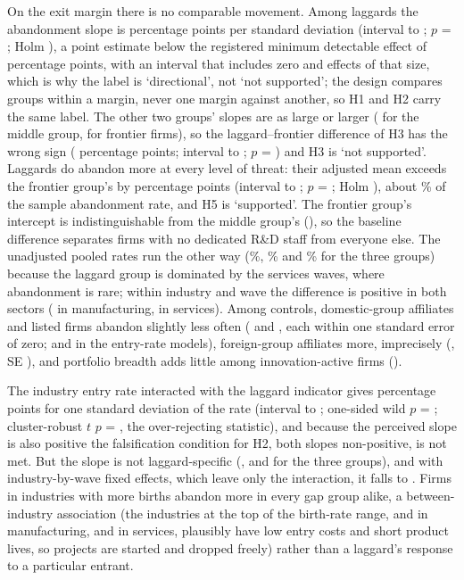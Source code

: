 \documentclass[preprint,12pt,authoryear]{elsarticle}
\begin{document}
On the exit margin there is no comparable movement. Among laggards the abandonment slope is \KISHTwoPp{} percentage points per standard deviation (interval \KISHTwoLoPp{} to \KISHTwoHiPp; $p$ = \KISHTwoPOne; Holm \KISHTwoHolm), a point estimate below the registered minimum detectable effect of \MDEQuitPp{} percentage points, with an interval that includes zero and effects of that size, which is why the label is `directional', not `not supported'; the design compares groups within a margin, never one margin against another, so H1 and H2 carry the same label. The other two groups' slopes are as large or larger (\CoefQuitXGOne{} for the middle group, \CoefQuitXGTwo{} for frontier firms), so the laggard--frontier difference of H3 has the wrong sign (\KISHThreePp{} percentage points; interval \KISHThreeLoPp{} to \KISHThreeHiPp; $p$ = \KISHThreePOne) and H3 is `not supported'. Laggards do abandon more at every level of threat: their adjusted mean exceeds the frontier group's by \KISHFivePp{} percentage points (interval \KISHFiveLoPp{} to \KISHFiveHiPp; $p$ = \KISHFivePOne; Holm \KISHFiveHolm), about \KISHFiveRelMeanPct\% of the sample abandonment rate, and H5 is `supported'. The frontier group's intercept is indistinguishable from the middle group's (\CoefQuitGTwo), so the baseline difference separates firms with no dedicated R\&D staff from everyone else. The unadjusted pooled rates run the other way (\RawQuitGZeroPct\%, \RawQuitGOnePct\% and \RawQuitGTwoPct\% for the three groups) because the laggard group is dominated by the services waves, where abandonment is rare; within industry and wave the difference is positive in both sectors (\RobManuHFiveEst{} in manufacturing, \RobServHFiveEst{} in services). Among controls, domestic-group affiliates and listed firms abandon slightly less often (\CoefQuitGroupDom{} and \CoefQuitListed, each within one standard error of zero; \CoefQuitObjGroupDom{} and \CoefQuitObjListed{} in the entry-rate models), foreign-group affiliates more, imprecisely (\CoefQuitGroupFor, SE \SEQuitGroupFor), and portfolio breadth adds little among innovation-active firms (\CoefQuitPortfolioBreadth).

The industry entry rate interacted with the laggard indicator gives \KISHTwoObjPp{} percentage points for one standard deviation of the rate (interval \KISHTwoObjLoPp{} to \KISHTwoObjHiPp; one-sided wild $p$ = \KISHTwoObjPOne; cluster-robust $t$ $p$ = \KISHTwoObjPOneT, the over-rejecting statistic), and because the perceived slope is also positive the falsification condition for H2, both slopes non-positive, is not met. But the slope is not laggard-specific (\CoefQuitObjXGZero, \CoefQuitObjXGOne{} and \CoefQuitObjXGTwo{} for the three groups), and with industry-by-wave fixed effects, which leave only the interaction, it falls to \RobFEIWHTwoObjEst. Firms in industries with more births abandon more in every gap group alike, a between-industry association (the industries at the top of the birth-rate range, \EntryMaxIndTwoZeroTwoTwoMLabel{} and \EntryMaxIndTwoZeroTwoFourMLabel{} in manufacturing, \EntryMaxIndTwoZeroTwoThreeSLabel{} and \EntryMaxIndTwoZeroTwoFiveSLabel{} in services, plausibly have low entry costs and short product lives, so projects are started and dropped freely) rather than a laggard's response to a particular entrant.
\end{document}

